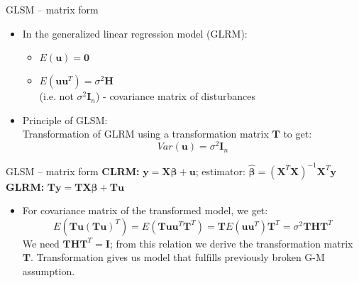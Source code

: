 \documentclass{beamer}
\begin{document}
\begin{frame}{GLSM – matrix form}
\begin{itemize}
\item In the generalized linear regression model (GLRM):
\begin{itemize}
\item $E(\boldsymbol{u})=\boldsymbol{0}$
\item $E(\boldsymbol{uu}^T)=\sigma^2\boldsymbol{H}$ \\ (i.e. not $\sigma^2 \boldsymbol{I}_{\! n}$) - covariance matrix of disturbances
\end{itemize}
\vspace{0.5cm}
\item Principle of GLSM: \\Transformation of GLRM using a transformation matrix $\boldsymbol{T}$ to get: 
$$\textit{Var}(\boldsymbol{u}) = \sigma^2 \boldsymbol{I}_{\! n}$$
\end{itemize}
\end{frame}


\begin{frame}{GLSM – matrix form}
\textbf{CLRM:} \hspace{0.2cm} $\boldsymbol{y}=\boldsymbol{X}\boldsymbol{\beta}+\boldsymbol{u}$; estimator: $\boldsymbol{\hat{\beta}}=(\boldsymbol{X}^T\boldsymbol{X})^{-1}\boldsymbol{X}^T\boldsymbol{y}$ \\
\textbf{GLRM:} $\boldsymbol{T}\boldsymbol{y}=\boldsymbol{TX}\boldsymbol{\beta}+\boldsymbol{T}\boldsymbol{u}$\\
\begin{itemize}
\item For covariance matrix of the transformed model, we get:
$$E(\boldsymbol{T}\boldsymbol{u}(\boldsymbol{T}\boldsymbol{u})^T)=
E(\boldsymbol{T}\boldsymbol{u}\boldsymbol{u}^T\boldsymbol{T}^T)=\boldsymbol{T} E(\boldsymbol{u}\boldsymbol{u}^T)\boldsymbol{T}^T=\sigma^2\boldsymbol{THT}^T$$
We need $\boldsymbol{THT}^T \! = \boldsymbol{I}$; from this relation we derive the transformation matrix $\boldsymbol{T}$.
Transformation gives us model that fulfills previously broken G-M assumption.
\end{itemize}
\end{frame}

\end{document}
